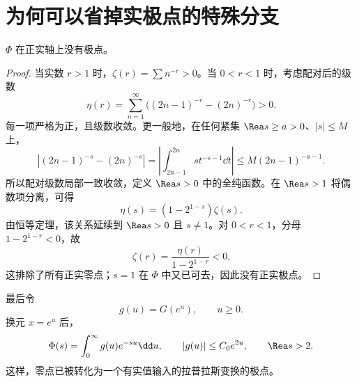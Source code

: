 \section{为何可以省掉实极点的特殊分支}
\begin{lemma}
\label{lem:no-real-poles}
$\Phi$ 在正实轴上没有极点。
\end{lemma}
\begin{proof}
当实数 $r>1$ 时，$\zeta(r)=\sum n^{-r}>0$。当 $0<r<1$ 时，考虑配对后的级数
\[
\eta(r)=\sum_{n=1}^\infty\bigl((2n-1)^{-r}-(2n)^{-r}\bigr)>0.
\]
每一项严格为正，且级数收敛。更一般地，在任何紧集 $\Rea s\ge a>0$、$|s|\le M$ 上，
\[
\left|(2n-1)^{-s}-(2n)^{-s}\right|
=\left|\int_{2n-1}^{2n}s t^{-s-1}\dd t\right|
\le M(2n-1)^{-a-1}.
\]
所以配对级数局部一致收敛，定义 $\Rea s>0$ 中的全纯函数。在 $\Rea s>1$ 将偶数项分离，可得
\[
\eta(s)=(1-2^{1-s})\zeta(s).
\]
由恒等定理，该关系延续到 $\Rea s>0$ 且 $s\ne1$。对 $0<r<1$，分母 $1-2^{1-r}<0$，故
\[
\zeta(r)=\frac{\eta(r)}{1-2^{1-r}}<0.
\]
这排除了所有正实零点；$s=1$ 在 $\Phi$ 中又已可去，因此没有正实极点。
\end{proof}

最后令
\begin{equation}
g(u)=G(e^u),\qquad u\ge0.
\label{eq:g}
\end{equation}
换元 $x=e^u$ 后，
\begin{equation}
\Phi(s)=\int_0^\infty g(u)e^{-su}\dd u,
\qquad |g(u)|\le C_0e^{2u},\qquad \Rea s>2.
\label{eq:Laplace}
\end{equation}
这样，零点已被转化为一个有实值输入的拉普拉斯变换的极点。
